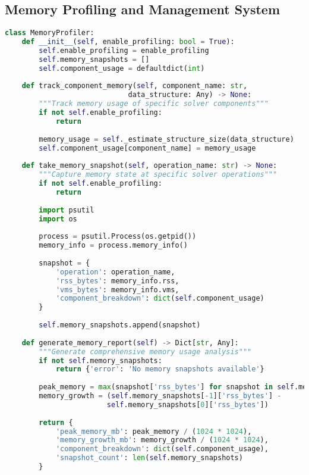 \subsection{Memory Profiling and Management System}
\label{appendix:memory-profiling}

\begin{lstlisting}[language=Python, caption=Memory Profiling and Management System]
class MemoryProfiler:
    def __init__(self, enable_profiling: bool = True):
        self.enable_profiling = enable_profiling
        self.memory_snapshots = []
        self.component_usage = defaultdict(int)
    
    def track_component_memory(self, component_name: str, 
                             data_structure: Any) -> None:
        """Track memory usage of specific solver components"""
        if not self.enable_profiling:
            return
        
        memory_usage = self._estimate_structure_size(data_structure)
        self.component_usage[component_name] = memory_usage
    
    def take_memory_snapshot(self, operation_name: str) -> None:
        """Capture memory state at specific solver operations"""
        if not self.enable_profiling:
            return
        
        import psutil
        import os
        
        process = psutil.Process(os.getpid())
        memory_info = process.memory_info()
        
        snapshot = {
            'operation': operation_name,
            'rss_bytes': memory_info.rss,
            'vms_bytes': memory_info.vms,
            'component_breakdown': dict(self.component_usage)
        }
        
        self.memory_snapshots.append(snapshot)
    
    def generate_memory_report(self) -> Dict[str, Any]:
        """Generate comprehensive memory usage analysis"""
        if not self.memory_snapshots:
            return {'error': 'No memory snapshots available'}
        
        peak_memory = max(snapshot['rss_bytes'] for snapshot in self.memory_snapshots)
        memory_growth = (self.memory_snapshots[-1]['rss_bytes'] - 
                        self.memory_snapshots[0]['rss_bytes'])
        
        return {
            'peak_memory_mb': peak_memory / (1024 * 1024),
            'memory_growth_mb': memory_growth / (1024 * 1024),
            'component_breakdown': dict(self.component_usage),
            'snapshot_count': len(self.memory_snapshots)
        }
\end{lstlisting}

